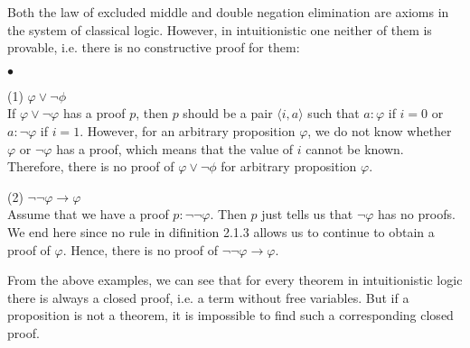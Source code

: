 \documentclass[12pt,a4paper]{article}
\theoremstyle{definition}
\theoremstyle{plain}
\theoremstyle{plain}
\theoremstyle{plain}
\newenvironment{myitemize}
{\begin{list}{$ \bullet $}{
  \topsep=2pt
  \itemsep=2pt
  \parsep=0pt
  \parskip=0pt
  \labelsep=5pt
  \labelwidth=20pt}}
{\end{list}}
\begin{document}
Both the law of excluded middle and double negation elimination are axioms in the system of classical logic. However, in intuitionistic one neither of them is provable, i.e. there is no constructive proof for them:
\begin{myitemize}
\item[(1)] $ \varphi \lor \neg \phi $\\
If $ \varphi \lor \neg \varphi $ has a proof $ p $, then $ p $ should be a pair $ \langle i, a \rangle $ such that $ a: \varphi $ if $ i = 0 $ or $ a: \neg \varphi $ if $ i = 1 $. However, for an arbitrary proposition $ \varphi $, we do not know whether $ \varphi $ or $ \neg \varphi $ has a proof, which means that the value of $ i $ cannot be known. Therefore, there is no proof of $ \varphi \lor \neg \phi $ for arbitrary proposition $ \varphi $.
\item[(2)] $ \neg \neg \varphi \to \varphi $\\
Assume that we have a proof $ p: \neg \neg \varphi $. Then $ p $ just tells us that $ \neg \varphi $ has no proofs. We end here since no rule in difinition 2.1.3 allows us to continue to obtain a proof of $ \varphi $. Hence, there is no proof of $ \neg \neg \varphi \to \varphi $.
\end{myitemize}

From the above examples, we can see that for every theorem in intuitionistic logic there is always a closed proof, i.e. a term without free variables. But if a proposition is not a theorem, it is impossible to find such a corresponding closed proof.
\end{document}
